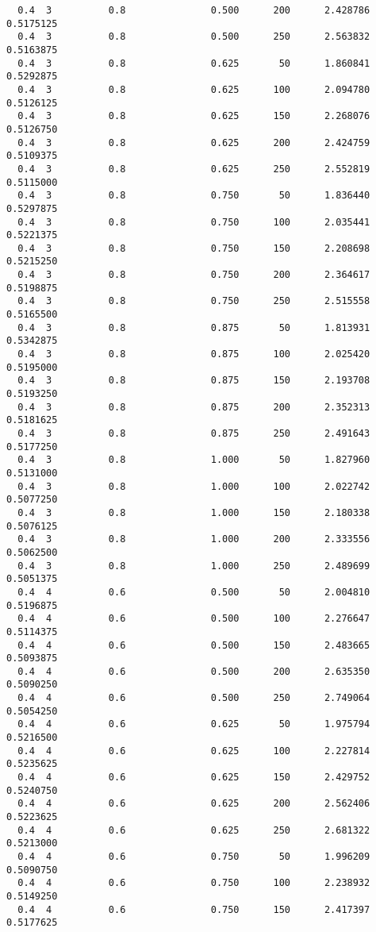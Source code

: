 \documentclass[
  letterpaper,
  DIV=11,
  numbers=noendperiod]{scrartcl}
\begin{document}
\begin{verbatim}
  0.4  3          0.8               0.500      200      2.428786  0.5175125
  0.4  3          0.8               0.500      250      2.563832  0.5163875
  0.4  3          0.8               0.625       50      1.860841  0.5292875
  0.4  3          0.8               0.625      100      2.094780  0.5126125
  0.4  3          0.8               0.625      150      2.268076  0.5126750
  0.4  3          0.8               0.625      200      2.424759  0.5109375
  0.4  3          0.8               0.625      250      2.552819  0.5115000
  0.4  3          0.8               0.750       50      1.836440  0.5297875
  0.4  3          0.8               0.750      100      2.035441  0.5221375
  0.4  3          0.8               0.750      150      2.208698  0.5215250
  0.4  3          0.8               0.750      200      2.364617  0.5198875
  0.4  3          0.8               0.750      250      2.515558  0.5165500
  0.4  3          0.8               0.875       50      1.813931  0.5342875
  0.4  3          0.8               0.875      100      2.025420  0.5195000
  0.4  3          0.8               0.875      150      2.193708  0.5193250
  0.4  3          0.8               0.875      200      2.352313  0.5181625
  0.4  3          0.8               0.875      250      2.491643  0.5177250
  0.4  3          0.8               1.000       50      1.827960  0.5131000
  0.4  3          0.8               1.000      100      2.022742  0.5077250
  0.4  3          0.8               1.000      150      2.180338  0.5076125
  0.4  3          0.8               1.000      200      2.333556  0.5062500
  0.4  3          0.8               1.000      250      2.489699  0.5051375
  0.4  4          0.6               0.500       50      2.004810  0.5196875
  0.4  4          0.6               0.500      100      2.276647  0.5114375
  0.4  4          0.6               0.500      150      2.483665  0.5093875
  0.4  4          0.6               0.500      200      2.635350  0.5090250
  0.4  4          0.6               0.500      250      2.749064  0.5054250
  0.4  4          0.6               0.625       50      1.975794  0.5216500
  0.4  4          0.6               0.625      100      2.227814  0.5235625
  0.4  4          0.6               0.625      150      2.429752  0.5240750
  0.4  4          0.6               0.625      200      2.562406  0.5223625
  0.4  4          0.6               0.625      250      2.681322  0.5213000
  0.4  4          0.6               0.750       50      1.996209  0.5090750
  0.4  4          0.6               0.750      100      2.238932  0.5149250
  0.4  4          0.6               0.750      150      2.417397  0.5177625

\end{verbatim}
\end{document}
